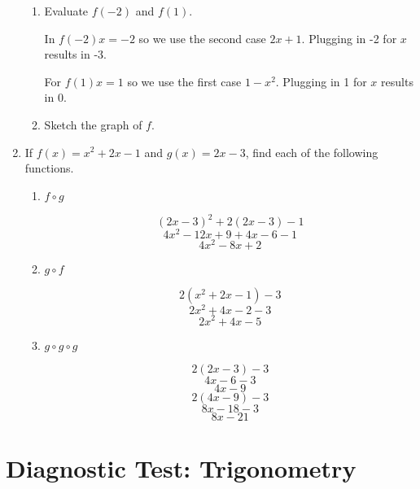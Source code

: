 \documentclass{article}
\begin{document}
\begin{enumerate}
	\begin{enumerate}
		\item Evaluate $f(-2)$ and $f(1)$.

		In $f(-2) x = -2$ so we use the second case $2x + 1$. Plugging in -2 for $x$ results in -3.

		For $f(1) x = 1$ so we use the first case $ 1 - x^{2} $. Plugging in 1 for $x$ results in 0.

		\item Sketch the graph of $f$.
	\end{enumerate}

	\item If $ f(x) = x^2 + 2x - 1$ and $g(x) = 2x - 3$, find each of the following functions.

	\begin{enumerate}
		\item $f \circ g$

			$$ (2x - 3)^ 2 + 2(2x-3) - 1 $$
			$$ 4x^2 - 12x + 9 + 4x - 6 - 1$$
			$$ 4x^2 - 8x + 2 $$

		\item $g \circ f$

			$$ 2(x^2 + 2x - 1) - 3$$
			$$ 2x^2 + 4x - 2 - 3$$
			$$ 2x^2 +4x -5 $$

		\item $g \circ g \circ g$

			$$ 2(2x - 3) - 3$$
			$$ 4x - 6 - 3 $$
			$$ 4x - 9 $$
			$$ 2(4x - 9) - 3 $$
			$$ 8x - 18 - 3 $$
			$$ 8x - 21 $$
	\end{enumerate}
\end{enumerate}

\newpage

\section{Diagnostic Test: Trigonometry}
\end{document}
